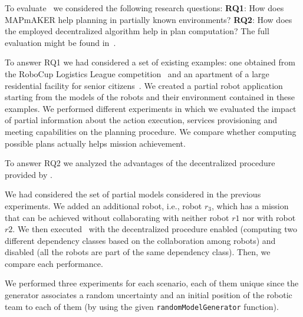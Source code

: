 

To evaluate  \toolName\ we considered the following research questions: \textbf{RQ1}: How does MAPmAKER help planning in partially known environments? \textbf{RQ2}: How does the employed decentralized algorithm help in plan computation?
The full evaluation might be found in~\cite{menghi2018multi}. 

To answer RQ1 we  had considered a set of existing examples:
one obtained from the RoboCup Logistics League competition~\cite{karrasrobocup} and an apartment of a large residential facility for senior citizens~\cite{map}.
We created a partial robot application starting from the models of the robots and their environment contained in these examples.
We performed different experiments in which we evaluated the impact of partial information about the action execution, services provisioning and meeting capabilities on the planning procedure.
We compare whether computing possible plans actually helps mission achievement.

To answer RQ2 we analyzed the advantages of the decentralized procedure provided by \toolName.

We had considered the set of partial models considered in the previous experiments. 
We added an additional robot, i.e., robot $r_3$, which has a mission that can be achieved without collaborating with neither  robot $r1$ nor with robot $r2$. 
We then executed \toolName\ with the decentralized procedure enabled (computing two different dependency classes based on the collaboration among robots) and disabled (all the robots are part of the same dependency class). 
Then, we compare each performance. 

We performed three experiments for each scenario, each of them unique since the generator associates a random uncertainty and an initial position of the robotic team to each of them (by using the given \texttt{randomModelGenerator} function).


